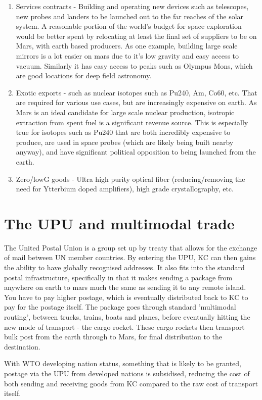 \documentclass[10pt]{article}
\begin{document}
\begin{enumerate}
    \item Services contracts - Building and operating new devices such as telescopes, new probes and landers to be launched out to the far reaches of the solar system. A reasonable portion of the world's budget for space exploration would be better spent by relocating at least the final set of suppliers to be on Mars, with earth based producers. As one example, building large scale mirrors is a lot easier on mars due to it's low gravity and easy access to vacuum. Similarly it has easy access to peaks such as Olympus Mons, which are good locations for deep field astronomy.
    \item Exotic exports - such as nuclear isotopes such as Pu240, Am, Co60, etc. That are required for various use cases, but are increasingly expensive on earth. As Mars is an ideal candidate for large scale nuclear production, isotropic extraction from spent fuel is a significant revenue source. This is especially true for isotopes such as Pu240 that are both incredibly expensive to produce, are used in space probes (which are likely being built nearby anyway), and have significant political opposition to being launched from the earth.
    \item Zero/lowG goods - Ultra high purity optical fiber (reducing/removing the need for Ytterbium doped amplifiers), high grade crystallography, etc.
\end{enumerate}

\section{The UPU and multimodal trade}
The United Postal Union is a group set up by treaty that allows for the exchange of mail between UN member countries. By entering the UPU, KC can then gains the ability to have globally recognised addresses. It also fits into the standard postal infrastructure, specifically in that it makes sending a package from anywhere on earth to mars much the same as sending it to any remote island. You have to pay higher postage, which is eventually distributed back to KC to pay for the postage itself. The package goes through standard 'multimodal routing', between trucks, trains, boats and planes, before eventually hitting the new mode of transport - the cargo rocket. These cargo rockets then transport bulk post from the earth through to Mars, for final distribution to the destination.

With WTO developing nation status, something that is likely to be granted, postage via the UPU from developed nations is subsidised, reducing the cost of both sending and receiving goods from KC compared to the raw cost of transport itself.
\end{document}
